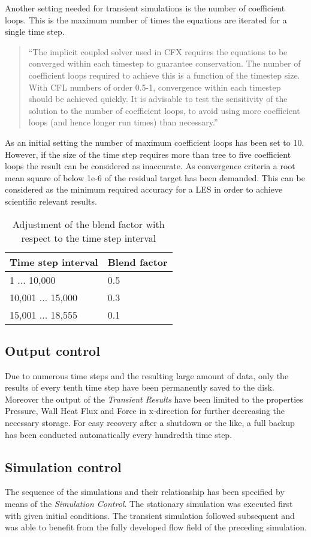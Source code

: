 Another setting needed for transient simulations is the number of coefficient loops. This is the maximum number of times the equations are iterated for a single time step.
\begin{quote}
``The implicit coupled solver used in CFX requires the equations to be converged within each timestep to guarantee conservation. The number of coefficient loops required to achieve this is a function of the timestep size. With CFL numbers of order 0.5-1, convergence within each timestep should be achieved quickly. It is advisable to test the sensitivity of the solution to the number of coefficient loops, to avoid using more coefficient loops (and hence longer run times) than necessary.'' \cite{sas_ip2}
\end{quote}
As an initial setting the number of maximum coefficient loops has been set to 10. However, if the size of the time step requires more than tree to five coefficient loops the result can be considered as inaccurate.
As convergence criteria a root mean square of below 1e-6 of the residual target has been demanded. This can be considered as the minimum required accuracy for a LES in order to achieve scientific relevant results.
\begin{table}[ht]
\centering
\caption{Adjustment of the blend factor with respect to the time step interval}
\label{tab:blend_factor}
\begin{tabular}{ll}
Time step interval&Blend factor\\
\hline
1 ... 10,000&0.5\\
10,001 ... 15,000&0.3\\
15,001 ... 18,555&0.1\\
\end{tabular}
\end{table}

\subsection{Output control}
Due to numerous time steps and the resulting large amount of data, only the results of every tenth time step have been permanently saved to the disk. Moreover the output of the \emph{Transient Results} have been limited to the properties Pressure, Wall Heat Flux and Force in x-direction for further decreasing the necessary storage.
For easy recovery after a shutdown or the like, a full backup has been conducted automatically every hundredth time step.
\subsection{Simulation control}
The sequence of the simulations and their relationship has been specified by means of the \emph{Simulation Control}. The stationary simulation was executed first with given initial conditions. The transient simulation followed subsequent and was able to benefit from the fully developed flow field of the preceding simulation.
